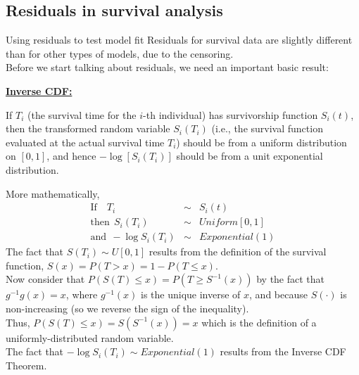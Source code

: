 \documentclass[envcountsect, 10pt, portrait, palatino]{beamer}
\begin{document}
\subsection{Residuals in survival analysis}
\begin{frame}{Using residuals to test model fit}
Residuals for survival data are slightly different than for other
types of models, due to the censoring. \\[2ex]
Before we start talking
about residuals, we need an important basic result:

\vspace{0.3in}
{\bf
\underline{\bf Inverse CDF:}

If $T_i$ (the survival time for the $i$-th individual) has
survivorship function $S_i(t)$, then the transformed
random variable $S_i(T_i)$ (i.e., the survival function evaluated at
the actual survival time $T_i$) should be from a uniform distribution on
$[0,1]$, and hence $-\log[S_i(T_i)]$ should be from a unit exponential
distribution.}
\end{frame}
\begin{frame}
More mathematically,
\begin{eqnarray*}
\mbox{If ~~} T_i  & \sim & S_i(t)\\[1ex]
\mbox{then}~~ S_i(T_i) & \sim &  Uniform[0,1]\\[1ex]
\mbox{and}~~ -\log S_i(T_i) & \sim & Exponential(1)
\end{eqnarray*}
The fact that $S(T_i)\sim U[0,1]$ results from the definition of the survival function, $S(x)=P(T>x)=1-P(T\leq x)$. \\[2ex]
Now consider that $P(S(T)\leq x)=P(T\geq S^{-1}(x))$ by the fact that $g^{-1}g(x)=x$, where $g^{-1}(x)$ is the unique inverse of $x$, and because $S(\cdot)$ is non-increasing (so we reverse the sign of the inequality). \\[2ex]
Thus, $P(S(T)\leq x)=S(S^{-1}(x))=x$ which is the definition of a uniformly-distributed random variable. \\[2ex]
The fact that $-\log S_i(T_i)\sim \textit{Exponential}(1)$ results from the Inverse CDF Theorem.
\end{frame}
\end{document}
